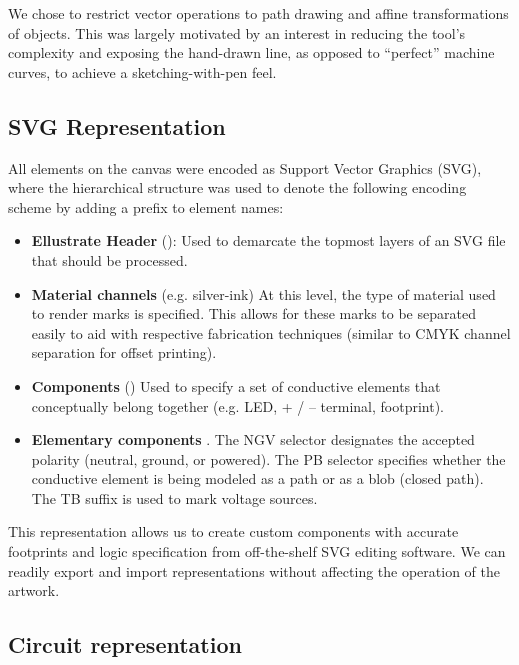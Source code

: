 \documentclass{sigchi}
\begin{document}
    We chose to restrict vector operations to path drawing and affine transformations of objects. This was largely motivated by an interest in reducing the tool's complexity and exposing the hand-drawn line, as opposed to ``perfect'' machine curves, to achieve a sketching-with-pen feel. 
    
    \subsection{SVG Representation}
    All elements on the canvas were encoded as Support Vector Graphics (SVG), where the hierarchical structure was used to denote the following encoding scheme by adding a prefix to element names:
    \begin{itemize}
        \item \textbf{Ellustrate Header} (): Used to demarcate the topmost layers of an SVG file that should be processed. 
        \item \textbf{Material channels} (e.g.  silver-ink) At this level, the type of material used to render marks is specified. This allows for these marks to be separated easily to aid with respective fabrication techniques (similar to CMYK channel separation for offset printing). 
        \item \textbf{Components} () Used to specify a set of conductive elements that conceptually belong together (e.g. LED, + / – terminal, footprint). 
        \item \textbf{Elementary components} . 
        The N\textbar G\textbar V selector designates the accepted polarity (neutral, ground, or powered). The P\textbar B selector specifies whether the conductive element is being modeled as a path or as a blob (closed path). The TB suffix is used to mark voltage sources.
    \end{itemize}
    
    This representation allows us to create custom components with accurate footprints and logic specification from off-the-shelf SVG editing software. We can readily export and import representations without affecting the operation of the artwork. 
 
    \subsection{Circuit representation}
    
\end{document}

